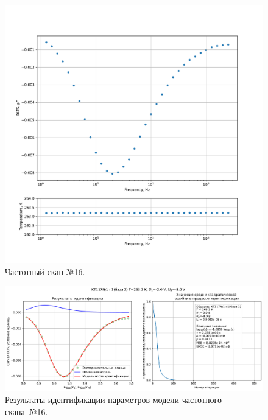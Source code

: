 \begin{figure}[!ht]
    \centering
    \includegraphics[width=1\textwidth]{../plots/КТ117№1_п1(база 2)_2500Гц-1Гц_1пФ_-10С_-2В-8В_100мВ_20мкс_шаг_0,1.pdf}
    \caption{Частотный скан №16.}
    \label{pic:frequency_scan_16}
\end{figure}

\begin{figure}[!ht]
    \centering
    \includegraphics[width=1\textwidth]{../plots/КТ117№1_п1(база 2)_2500Гц-1Гц_1пФ_-10С_-2В-8В_100мВ_20мкс_шаг_0,1_model.pdf}
    \caption{Результаты идентификации параметров модели частотного скана~№16.}
    \label{pic:frequency_scan_model16}
\end{figure}

\pagebreak


